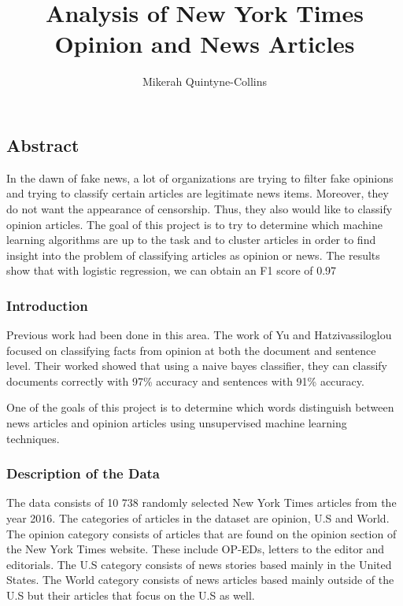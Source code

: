 \documentclass[11pt]{article}
\title{Analysis of New York Times Opinion and News Articles}
\author{Mikerah Quintyne-Collins}
\begin{document}
    
    
    \maketitle
    
    

    
    \subsection{Abstract}\label{abstract}

In the dawn of fake news, a lot of organizations are trying to filter
fake opinions and trying to classify certain articles are legitimate
news items. Moreover, they do not want the appearance of censorship.
Thus, they also would like to classify opinion articles. The goal of
this project is to try to determine which machine learning algorithms
are up to the task and to cluster articles in order to find insight into
the problem of classifying articles as opinion or news. The results show
that with logistic regression, we can obtain an F1 score of 0.97

    \subsubsection{Introduction}\label{introduction}

Previous work had been done in this area. The work of Yu and
Hatzivassiloglou focused on classifying facts from opinion at both the
document and sentence level. Their worked showed that using a naive
bayes classifier, they can classify documents correctly with 97\%
accuracy and sentences with 91\% accuracy.

One of the goals of this project is to determine which words distinguish
between news articles and opinion articles using unsupervised machine
learning techniques.

    \subsubsection{Description of the Data}\label{description-of-the-data}

The data consists of 10 738 randomly selected New York Times articles
from the year 2016. The categories of articles in the dataset are
opinion, U.S and World. The opinion category consists of articles that
are found on the opinion section of the New York Times website. These
include OP-EDs, letters to the editor and editorials. The U.S category
consists of news stories based mainly in the United States. The World
category consists of news articles based mainly outside of the U.S but
their articles that focus on the U.S as well.
\end{document}
